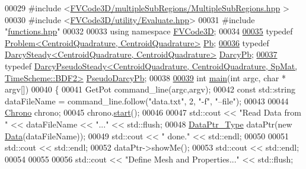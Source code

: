 \begin{DoxyCode}
00029 \textcolor{preprocessor}{#include <\hyperlink{MultipleSubRegions_8hpp}{FVCode3D/multipleSubRegions/MultipleSubRegions.hpp}
      >}
00030 \textcolor{preprocessor}{#include <\hyperlink{Evaluate_8hpp}{FVCode3D/utility/Evaluate.hpp}>}
00031 \textcolor{preprocessor}{#include "\hyperlink{functions_8hpp}{functions.hpp}"}
00032 
00033 \textcolor{keyword}{using namespace }\hyperlink{namespaceFVCode3D}{FVCode3D};
00034 
\hypertarget{main_8cpp_source.tex_l00035}{}\hyperlink{main_8cpp_a3c96af59123b410487ff565fb24281ed}{00035} \textcolor{keyword}{typedef} \hyperlink{classFVCode3D_1_1Problem}{Problem<CentroidQuadrature, CentroidQuadrature>} 
      \hyperlink{main_8cpp_a3c96af59123b410487ff565fb24281ed}{Pb};
\hypertarget{main_8cpp_source.tex_l00036}{}\hyperlink{main_8cpp_ab0de87680f9f2dfa547e659c7da3d1e4}{00036} \textcolor{keyword}{typedef} \hyperlink{classFVCode3D_1_1DarcySteady}{DarcySteady<CentroidQuadrature, CentroidQuadrature>}
       \hyperlink{main_8cpp_ab0de87680f9f2dfa547e659c7da3d1e4}{DarcyPb};
\hypertarget{main_8cpp_source.tex_l00037}{}\hyperlink{main_8cpp_aff54e4c6bbc30b11899898af00325b15}{00037} \textcolor{keyword}{typedef} 
      \hyperlink{classFVCode3D_1_1DarcyPseudoSteady}{DarcyPseudoSteady<CentroidQuadrature, CentroidQuadrature, SpMat, TimeScheme::BDF2>}
       \hyperlink{main_8cpp_aff54e4c6bbc30b11899898af00325b15}{PseudoDarcyPb};
00038 
\hypertarget{main_8cpp_source.tex_l00039}{}\hyperlink{main_8cpp_a0ddf1224851353fc92bfbff6f499fa97}{00039} \textcolor{keywordtype}{int} \hyperlink{main_8cpp_a0ddf1224851353fc92bfbff6f499fa97}{main}(\textcolor{keywordtype}{int} argc, \textcolor{keywordtype}{char} * argv[])
00040 \{
00041     GetPot command\_line(argc,argv);
00042     \textcolor{keyword}{const} std::string dataFileName = command\_line.follow(\textcolor{stringliteral}{"data.txt"}, 2, \textcolor{stringliteral}{"-f"}, \textcolor{stringliteral}{"--file"});
00043 
00044     \hyperlink{classFVCode3D_1_1Chrono}{Chrono} chrono;
00045     chrono.\hyperlink{classFVCode3D_1_1Chrono_a13f2f4fa4096ec9eafa7ad59fea3df87}{start}();
00046 
00047     std::cout << \textcolor{stringliteral}{"Read Data from "} << dataFileName << \textcolor{stringliteral}{"..."} << std::flush;
00048     \hyperlink{namespaceFVCode3D_a3d19a370a98afe491a9e17a646a9c56f}{DataPtr\_Type} dataPtr(\textcolor{keyword}{new} \hyperlink{classFVCode3D_1_1Data}{Data}(dataFileName));
00049     std::cout << \textcolor{stringliteral}{" done."} << std::endl;
00050 
00051     std::cout << std::endl;
00052     dataPtr->showMe();
00053     std::cout << std::endl;
00054 
00055 
00056     std::cout << \textcolor{stringliteral}{"Define Mesh and Properties..."} << std::flush;

\end{DoxyCode}
